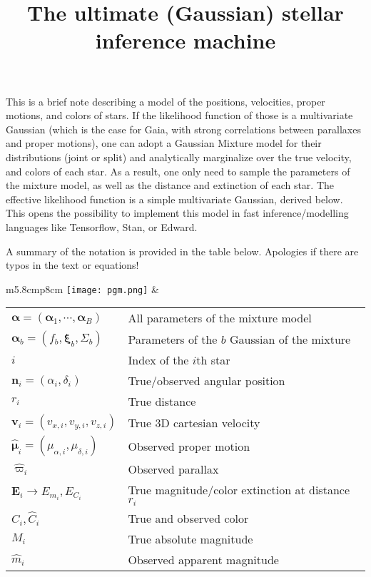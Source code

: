\documentclass{article}
\renewcommand{\vec}[1]{\boldsymbol{#1}}
\begin{document}
 
\title{The ultimate (Gaussian) stellar inference machine}
 \date{}
 \author{}
 
\maketitle

This is a brief note describing a model of the positions, velocities, proper motions, and colors of stars. If the likelihood function of those is a multivariate Gaussian (which is the case for Gaia, with strong correlations between parallaxes and proper motions), one can adopt a Gaussian Mixture model for their distributions (joint or split) and analytically marginalize over the true velocity, and colors of each star. As a result, one only need to sample the parameters of the mixture model, as well as the distance and extinction of each star. The effective likelihood function is a simple multivariate Gaussian, derived below. This opens the possibility to implement this model in fast inference/modelling languages like Tensorflow, Stan, or Edward.

A summary of the notation is provided in the table below. Apologies if there are typos in the text or equations!

\begin{tabular}{m{5.8cm}p{8cm}}
\hspace*{-0.8cm}\texttt{[image: pgm.png]}
&
\begin{tabular}{ll}
	$\vec{\alpha} = (\vec{\alpha}_1, \cdots, \vec{\alpha}_B)$	&	All parameters of the mixture model\\
	$\vec{\alpha}_b = (f_b, \vec{\xi}_b, \Sigma_b)$ 	&	Parameters of the $b$ Gaussian of the mixture\\
	$i$	&	Index of the $i$th star	\\
	$\vec{n}_i = (\alpha_i, \delta_i)$ 	&	True/observed angular position	\\
	$r_i$		&	True distance	\\
	$\vec{v}_i = (v_{x,i}, v_{y,i}, v_{z,i})$	&	True 3D cartesian velocity		\\
	$\hat{\vec{\mu}}_i = (\mu_{\alpha,i}, \mu_{\delta,i})$	&	Observed proper motion \\
	$\hat{\varpi}_i$	&	Observed parallax	\\
	$\vec{E}_i \rightarrow E_{m_i}, E_{C_i}$	&	True magnitude/color extinction at distance $r_i$ 	\\
	$C_i, \hat{C}_i$	&	True and observed color	\\
	$M_i$	&	True absolute magnitude \\
	$\hat{m}_i$	&	Observed apparent magnitude \\
\end{tabular}
\end{tabular}
\end{document}
